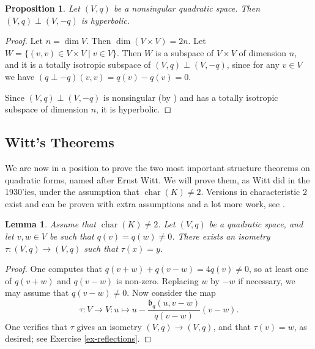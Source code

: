 \documentclass[12pt, leqno, british]{amsart}
\theoremstyle{definition}
\theoremstyle{plain}
\newtheorem{prop}[defi]{Proposition}
\newtheorem{lem}[defi]{Lemma}
\theoremstyle{remark}
\newcommand{\mf}{\mathfrak}
\DeclareMathOperator{\charac}{char}
\begin{document}
\begin{prop}\label{P:q-q-hyperbolic}
Let $(V, q)$ be a nonsingular quadratic space. Then $(V, q) \perp (V, -q)$ is hyperbolic.
\end{prop}
\begin{proof}
Let $n = \dim V$. Then $\dim (V \times V) = 2n$.
Let $W = \lbrace (v, v) \in V \times V \mid v \in V \rbrace$. Then $W$ is a subspace of $V \times V$ of dimension $n$, and it is a totally isotropic subspace of $(V, q) \perp (V, -q)$, since for any $v \in V$ we have $(q \perp -q)(v, v) = q(v) - q(v) = 0$.

Since $(V, q) \perp (V, -q)$ is nonsingular (by ) and has a totally isotropic subspace of dimension $n$, it is hyperbolic.
\end{proof}

\subsection{Witt's Theorems}
We are now in a position to prove the two most important structure theorems on quadratic forms, named after Ernst Witt.
We will prove them, as Witt did in the 1930'ies, under the assumption that $\charac(K) \neq 2$.
Versions in characteristic 2 exist and can be proven with extra assumptions and a lot more work, see \autocite[Section 8]{ElmanKarpenkoMerkurjev}.
\begin{lem}\label{L:O(q)-transitive}
Assume that $\charac(K) \neq 2$.
Let $(V, q)$ be a quadratic space, and let $v, w \in V$ be such that $q(v) = q(w) \neq 0$.
There exists an isometry $\tau: (V, q) \to (V, q)$ such that $\tau(x) = y$.
\end{lem}
\begin{proof}
One computes that $q(v + w) + q(v - w) = 4q(v) \neq 0$, so at least one of $q(v+w)$ and $q(v-w)$ is non-zero.
Replacing $w$ by $-w$ if necessary, we may assume that $q(v-w) \neq 0$.
Now consider the map
$$\tau : V \to V : u \mapsto u - \frac{\mf{b}_q(u, v-w)}{q(v-w)}(v-w).$$
One verifies that $\tau$ gives an isometry $(V, q) \to (V, q)$, and that $\tau(v) = w$, as desired; see Exercise \eqref{ex-reflections}.
\end{proof}
\end{document}
